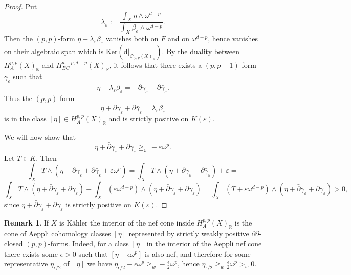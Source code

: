 \documentclass[a4,reqno]{amsart}
\theoremstyle{definition}
\newtheorem{remark}[theorem]{Remark}
\def\cE{\mathcal E}
\newcommand{\R}{\mathbb{R}}
\def\d{\mbox{d}}
\def\Ker{\mbox{Ker}}
\numberwithin{equation}{section}
\begin{document}
\begin{proof}
Put   
$$\lambda_{\varepsilon}:=
\frac {\int_{X}\eta\wedge\omega^{d-p}}{\int_{X}\beta_{\varepsilon}\wedge\omega^{d-p}}.$$  Then
the $(p,p)$-form $\eta-\lambda_{\varepsilon}\beta_{\varepsilon}$ vanishes both on $F$ and on $\omega^{d-p}$, hence vanishes on their algebraic span which is  $\Ker(\d|_{ \cE'_{p,p}(X)_\R}).$
By
 the duality between 
$H^{p,p}_A(X)_{\R}$ and $H^{d-p,d-p}_{BC}(X)_{\R}$, 
it follows that there exists a $(p,p-1)$-form $\gamma_{\varepsilon}$ such that 
$$
\eta-\lambda_{\varepsilon}\beta_{\varepsilon}=
-\bar\partial\gamma_{\varepsilon}-\partial\bar\gamma_{\varepsilon}.
$$ 
Thus the $(p,p)$-form 
$$
\eta+\bar\partial\gamma_{\varepsilon}+
\partial\bar\gamma_{\varepsilon}=\lambda_{\varepsilon}\beta_{\varepsilon}
$$
is in the class $[\eta]\in H^{p,p}_A(X)_{\R}$ and 
is strictly positive on $K(\varepsilon)$. 

We will now show that 
$$\eta+\bar\partial\gamma_{\varepsilon}+
\partial\bar\gamma_{\varepsilon}\ge_{w}-\varepsilon\omega^{p}.$$
Let  $T\in K$. Then 
$$\int_{X}T\wedge(\eta+\bar\partial\gamma_{\varepsilon}+
\partial\bar\gamma_{\varepsilon}+\varepsilon\omega^{p})=
\int_{X}T\wedge(\eta+\bar\partial\gamma_{\varepsilon}+
\partial\bar\gamma_{\varepsilon})+\varepsilon=$$
$$\int_{X}T\wedge(\eta+\bar\partial\gamma_{\varepsilon}+
\partial\bar\gamma_{\varepsilon})+\int_{X}(\varepsilon\omega^{d-p})\wedge(\eta+\bar\partial\gamma_{\varepsilon}+
\partial\bar\gamma_{\varepsilon})=
\int_{X}(T+\varepsilon\omega^{d-p})\wedge(\eta+\bar\partial\gamma_{\varepsilon}+
\partial\bar\gamma_{\varepsilon})>0,$$
since $\eta+\bar\partial\gamma_{\varepsilon}+
\partial\bar\gamma_{\varepsilon}$ is strictly positive on $K(\varepsilon)$.
\end{proof}

\begin{remark}
    If $X$ is K\"ahler the interior of the nef cone inside $H^{p,p}_A(X)_{\R}$ is the cone of Aeppli cohomology classes $[\eta]$ represented by strictly weakly positive $\partial\bar\partial$-closed $(p,p)$-forms. Indeed, for a class $[\eta]$ in the interior of the Aeppli nef cone there exists some $\epsilon>0$ such that $[\eta-\epsilon\omega^p]$ is also nef, and therefore for some representative $\eta_{\epsilon/2}$ of $[\eta]$ we have $\eta_{\epsilon/2}-\epsilon\omega^p\ge_w-\frac{\epsilon}{2}\omega^p$, hence $\eta_{\epsilon/2}\ge_w\frac{\epsilon}{2}\omega^p>_w0$.
\end{remark}



\end{document}
